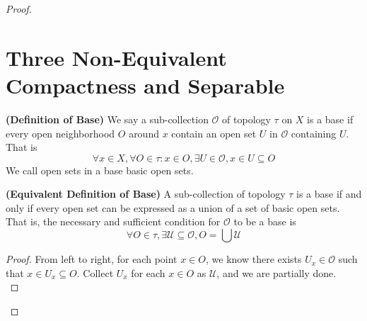 \documentclass{report}
\begin{document}
\begin{proof}
\section{Three Non-Equivalent Compactness and Separable}
\begin{definition}
\label{2.6.1}
\textbf{(Definition of Base)} We say a sub-collection $\mathcal{O}$ of topology $\tau$ on $X$ is a base if every open neighborhood $O$ around $x$ contain an open set $U$ in $\mathcal{O}$ containing $U$. That is
\begin{equation}
\forall x\in X, \forall O\in\tau:x\in O,\exists U\in \mathcal{O}, x\in U\subseteq O
\end{equation}
We call open sets in a base basic open sets.
\end{definition}
\begin{theorem}
\label{2.6.2}
\textbf{(Equivalent Definition of Base)} A sub-collection of topology $\tau$ is a base if and only if every open set can be expressed as a union of a set of basic open sets. That is, the necessary and sufficient condition for $\mathcal{O}$ to be a base is 
\begin{equation}
\forall O\in \tau, \exists \mathcal{U}\subseteq \mathcal{O}, O=\bigcup \mathcal{U}
\end{equation}
\end{theorem}
\begin{proof}
  From left to right, for each point $x\in O$, we know there exists $U_x\in \mathcal{O}$ such that $x\in U_x\subseteq O$. Collect $U_x$ for each $x\in O$ as $\mathcal{U}$, and we are partially done.\\


\end{proof}
\end{proof}
\end{document}
